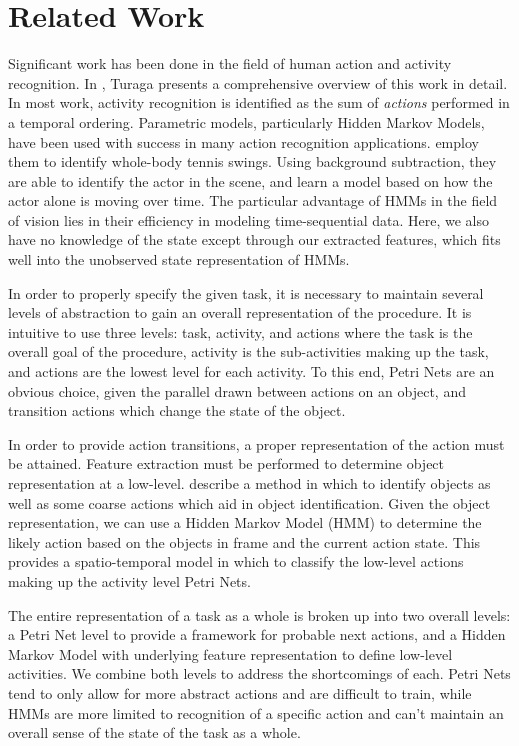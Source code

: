 \documentclass[10pt,letterpaper]{article}
\begin{document}
\section{Related Work}

Significant work has been done in the field of human action and activity recognition. In \cite{turaga2008machine}, Turaga presents a comprehensive overview of this work in detail. In most work, activity recognition is identified as the sum of \emph{actions} performed in a temporal ordering. Parametric models, particularly Hidden Markov Models, have been used with success in many action recognition applications. \cite{yamato1992recognizing} employ them to identify whole-body tennis swings. Using background subtraction, they are able to identify the actor in the scene, and learn a model based on how the actor alone is moving over time. The particular advantage of HMMs in the field of vision lies in their efficiency in modeling time-sequential data. Here, we also have no knowledge of the state except through our extracted features, which fits well into the unobserved state representation of HMMs.
	
In order to properly specify the given task, it is necessary to maintain several levels of abstraction to gain an overall representation of the procedure. It is intuitive to use three levels: task, activity, and actions where the task is the overall goal of the procedure, activity is the sub-activities making up the task, and actions are the lowest level for each activity. To this end, Petri Nets\cite{petri1966communication} are an obvious choice, given the parallel drawn between actions on an object, and transition actions which change the state of the object. 

In order to provide action transitions, a proper representation of the action must be attained. Feature extraction must be performed to determine object representation at a low-level. \cite{fathi2011understanding} describe a method in which to identify objects as well as some coarse actions which aid in object identification. Given the object representation, we can use a Hidden Markov Model (HMM) to determine the likely action based on the objects in frame and the current action state. This provides a spatio-temporal model in which to classify the low-level actions making up the activity level Petri Nets.

The entire representation of a task as a whole is broken up into two overall levels: a Petri Net level to provide a framework for probable next actions, and a Hidden Markov Model with underlying feature representation to define low-level activities. We combine both levels to address the shortcomings of each. Petri Nets tend to only allow for more abstract actions and are difficult to train, while HMMs are more limited to recognition of a specific action and can't maintain an overall sense of the state of the task as a whole.
  
\end{document}
